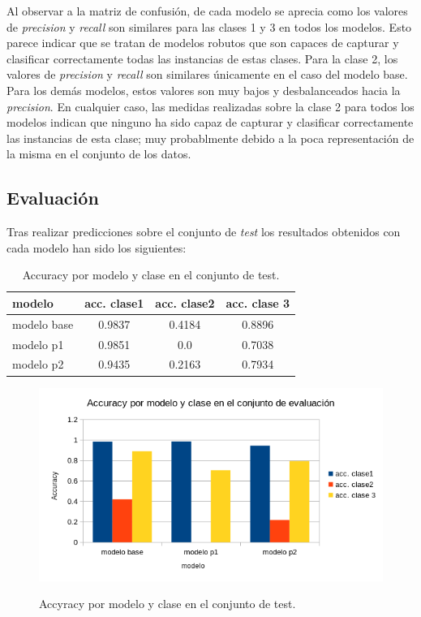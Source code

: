 \documentclass[es]{uc3mreport}
\begin{document}
\begin{report}
Al observar a la matriz de confusión, de cada modelo
se aprecia como los valores de \textit{precision} y \textit{recall} son
similares para las clases 1 y 3 en todos los modelos. Esto parece indicar que se
tratan de modelos robutos que son capaces de capturar y clasificar correctamente
todas las instancias de estas clases. Para la clase 2, los valores de \textit{precision} y \textit{recall} son
similares únicamente en el caso del modelo base. Para los demás modelos, estos
valores son muy bajos y desbalanceados hacia la \textit{precision}. En cualquier
caso, las medidas realizadas sobre la clase 2 para todos los modelos indican que
ninguno ha sido capaz de capturar y clasificar correctamente las instancias de
esta clase; muy probablmente debido a la poca representación de la misma en el
conjunto de los datos.

\subsection{Evaluación}
\label{subsec:comparar_test}

Tras realizar predicciones sobre el conjunto de \textit{test} los resultados
obtenidos con cada modelo han sido los siguientes:

\begin{table}[H]
\center
\begin{tabular}{@{}lccc@{}}
    \toprule
    modelo      & acc. clase1&	acc. clase2	& acc. clase 3 \\
    \midrule     
    modelo base & 0.9837     & 0.4184	& 0.8896 \\
    modelo p1   & 0.9851     & 0.0	    & 0.7038 \\
    modelo p2   & 0.9435     & 0.2163	& 0.7934 \\
    \bottomrule
\end{tabular}
    \caption{Accuracy por modelo y clase en el conjunto de test.}
\end{table}
\begin{figure}[H]
    \center
    \includegraphics[width=0.85\linewidth]{accModClassTest.png}\\
    \caption{Accyracy por modelo y clase en el conjunto de test.}
\end{figure}


\end{report}
\end{document}
